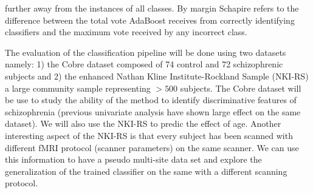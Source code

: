 further away from the instances of all classes. By margin Schapire refers to the difference between the total vote AdaBoost receives from correctly identifying classifiers and the maximum vote received by any incorrect class. 

The evaluation of the classification pipeline will be done using two datasets namely: 1) the Cobre dataset composed of 74 control and 72 schizophrenic subjects and 2) the enhanced Nathan Kline Institute-Rockland Sample (NKI-RS) a large community sample representing $>500$ subjects. The Cobre dataset will be use to study the ability of the method to identify discriminative features of schizophrenia (previous univariate analysis have shown large effect on the same dataset). We will also use the NKI-RS to predic the effect of age. Another interesting aspect of the NKI-RS is that every subject has been scanned with different fMRI protocol (scanner parameters) on the same scanner. We can use this information to have a pseudo multi-site data set and explore the generalization of the trained classifier on the same  with a different scanning protocol.




